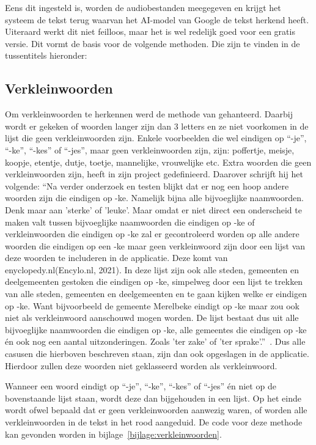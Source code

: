 Eens dit ingesteld is, worden de audiobestanden meegegeven en krijgt het systeem de tekst terug waarvan het AI-model van Google de tekst herkend heeft. Uiteraard werkt dit niet feilloos, maar het is wel redelijk goed voor een gratis versie. Dit vormt de basis voor de volgende methoden. Die zijn te vinden in de tussentitels hieronder:

\subsection{Verkleinwoorden}
Om verkleinwoorden te herkennen werd de methode van \textcite{Standaert2021} gehanteerd. Daarbij wordt er gekeken of woorden langer zijn dan 3 letters en ze niet voorkomen in de lijst die geen verkleinwoorden zijn. Enkele voorbeelden die wel eindigen op ``-je'', ``-ke'', ``-kes'' of ``-jes'', maar geen verkleinwoorden zijn, zijn: poffertje, meisje, koopje, etentje, dutje, toetje, mannelijke, vrouwelijke etc. Extra woorden die geen verkleinwoorden zijn, heeft \textcite{Standaert2021} in zijn project gedefinieerd. Daarover schrijft hij het volgende:
``Na verder onderzoek en testen blijkt dat er nog een hoop andere woorden zijn die eindigen
op -ke. Namelijk bijna alle bijvoeglijke naamwoorden. Denk maar aan ’sterke’ of ’leuke’.
Maar omdat er niet direct een onderscheid te maken valt tussen bijvoeglijke naamwoorden
die eindigen op -ke of verkleinwoorden die eindigen op -ke zal er gecontroleerd worden op
alle andere woorden die eindigen op een -ke maar geen verkleinwoord zijn door een lijst
van deze woorden te includeren in de applicatie. Deze komt van enyclopedy.nl(Encylo.nl,
2021). In deze lijst zijn ook alle steden, gemeenten en deelgemeenten gestoken die eindigen
op -ke, simpelweg door een lijst te trekken van alle steden, gemeenten en deelgemeenten
en te gaan kijken welke er eindigen op -ke. Want bijvoorbeeld de gemeente Merelbeke
eindigt op -ke maar zou ook niet als verkleinwoord aanschouwd mogen worden. De lijst
bestaat dus uit alle bijvoeglijke naamwoorden die eindigen op -ke, alle gemeentes die
eindigen op -ke én ook nog een aantal uitzonderingen. Zoals ’ter zake’ of ’ter sprake’.''~\autocite{Standaert2021}. Dus alle casusen die hierboven beschreven staan, zijn dan ook opgeslagen in de applicatie. Hierdoor zullen deze woorden niet geklasseerd worden als verkleinwoord.

Wanneer een woord eindigt op ``-je'', ``-ke'', ``-kes'' of ``-jes'' én niet op de bovenstaande lijst staan, wordt deze dan bijgehouden in een lijst. Op het einde wordt ofwel bepaald dat er geen verkleinwoorden aanwezig waren, of worden alle verkleinwoorden in de tekst in het rood aangeduid. De code voor deze methode kan gevonden worden in bijlage~\ref{bijlage:verkleinwoorden}.


